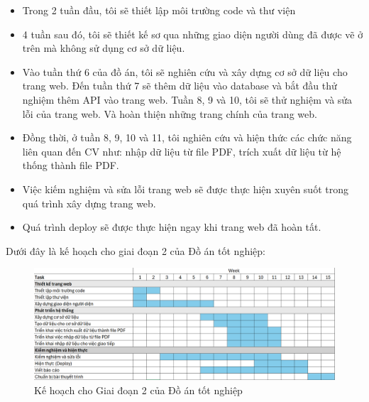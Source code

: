 \begin{itemize}
	\item Trong 2 tuần đầu, tôi sẽ thiết lập môi trường code và thư viện
	\item 4 tuần sau đó, tôi sẽ thiết kế sơ qua những giao diện người dùng đã được vẽ ở trên mà không sử dụng cơ sở dữ liệu.
	\item Vào tuần thứ 6 của đồ án, tôi sẽ nghiên cứu và xây dựng cơ sở dữ liệu cho trang web. Đến tuần thứ 7 sẽ thêm dữ liệu vào database và bắt đầu thử nghiệm thêm API vào trang web. Tuần 8, 9 và 10, tôi sẽ thử nghiệm và sửa lỗi của trang web. Và hoàn thiện những trang chính của trang web.
	\item Đồng thời, ở tuần 8, 9, 10 và 11, tôi nghiên cứu và hiện thức các chức năng liên quan đến CV như: nhập dữ liệu từ file PDF, trích xuất dữ liệu từ hệ thống thành file PDF.
	\item Việc kiếm nghiệm và sửa lỗi trang web sẽ được thực hiện xuyên suốt trong quá trình xây dựng trang web.
	\item Quá trình deploy sẽ được thực hiện ngay khi trang web đã hoàn tất.
\end{itemize}


Dưới đây là kế hoạch cho giai đoạn 2 của Đồ án tốt nghiệp:

\begin{figure}[H]
	\centering
	\includegraphics[scale=0.35]{img/TKB_GD2.png}
	\caption{Kế hoạch cho Giai đoạn 2 của Đồ án tốt nghiệp}
\end{figure}